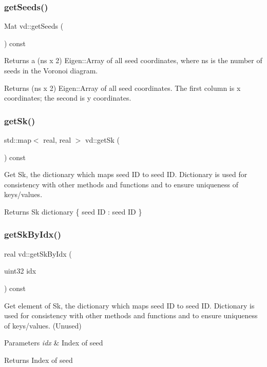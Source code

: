 \subsubsection{\texorpdfstring{get\+Seeds()}{getSeeds()}}
{\footnotesize\ttfamily Mat vd\+::get\+Seeds (\begin{DoxyParamCaption}{ }\end{DoxyParamCaption}) const}

Returns a (ns x 2) Eigen\+::\+Array of all seed coordinates, where ns is the number of seeds in the Voronoi diagram. \begin{DoxyReturn}{Returns}
(ns x 2) Eigen\+::\+Array of all seed coordinates. The first column is x coordinates; the second is y coordinates. 
\end{DoxyReturn}
\mbox{\label{classvd_a5c6dc6e749c955b5ee26139e19a02e0b}} 
\subsubsection{\texorpdfstring{get\+Sk()}{getSk()}}
{\footnotesize\ttfamily std\+::map$<$ real, real $>$ vd\+::get\+Sk (\begin{DoxyParamCaption}{ }\end{DoxyParamCaption}) const}

Get Sk, the dictionary which maps seed ID to seed ID. Dictionary is used for consistency with other methods and functions and to ensure uniqueness of keys/values. \begin{DoxyReturn}{Returns}
Sk dictionary \{ seed ID \+: seed ID \} 
\end{DoxyReturn}
\mbox{\label{classvd_a4d2c835e7804c4242dce6d411f01ce0a}} 
\subsubsection{\texorpdfstring{get\+Sk\+By\+Idx()}{getSkByIdx()}}
{\footnotesize\ttfamily real vd\+::get\+Sk\+By\+Idx (\begin{DoxyParamCaption}\item[{uint32}]{idx }\end{DoxyParamCaption}) const}

Get element of Sk, the dictionary which maps seed ID to seed ID. Dictionary is used for consistency with other methods and functions and to ensure uniqueness of keys/values. (Unused) 
\begin{DoxyParams}{Parameters}
{\em idx} & Index of seed \\
\hline
\end{DoxyParams}
\begin{DoxyReturn}{Returns}
Index of seed 
\end{DoxyReturn}
\mbox{\label{classvd_a340f3f92b9ae32ff0f3eb2ce6cf12bd6}} 

